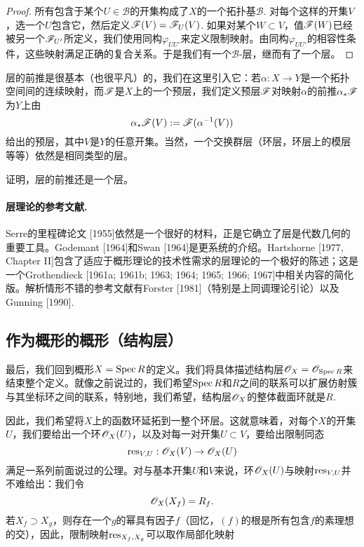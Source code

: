 \begin{proof}
	所有包含于某个$U\in\mathscr{B}$的开集构成了$X$的一个拓扑基$\mathscr{B}$. 对每个这样的开集$V$，选一个$U$包含它，然后定义$\mathscr{F}(V)=\mathscr{F}_U(V)$. 如果对某个$W\subset V$，值$\mathscr{F}(W)$已经被另一个$\mathscr{F}_{U'}$所定义，我们使用同构$\varphi_{UU'}$来定义限制映射。由同构$\varphi_{UU'}$的相容性条件，这些映射满足正确的复合关系。于是我们有一个$\mathscr{B}$\hyp 层，继而有了一个层。
\end{proof}

层的前推是很基本（也很平凡）的，我们在这里引入它：若$\alpha:X\to Y$是一个拓扑空间间的连续映射，而$\mathscr{F}$是$X$上的一个预层，我们定义预层$\mathscr{F}$对映射$\alpha$的前推$\alpha_*\mathscr{F}$为$Y$上由
\[
	\alpha_*\mathscr{F}(V):=\mathscr{F}(\alpha^{-1}(V))
\]
给出的预层，其中$V$是$Y$的任意开集。当然，一个交换群层（环层，环层上的模层等等）依然是相同类型的层。

\begin{exe}
证明，层的前推还是一个层。
\end{exe}

\paragraph*{层理论的参考文献.}\label{ref:1} Serre的里程碑论文 [1955]依然是一个很好的材料，正是它确立了层是代数几何的重要工具。Godemant [1964]和Swan [1964]是更系统的介绍。Hartshorne [1977, Chapter II]包含了适应于概形理论的技术性需求的层理论的一个极好的陈述；这是一个Grothendieck [1961a; 1961b; 1963; 1964; 1965; 1966; 1967]中相关内容的简化版。解析情形不错的参考文献有Forster [1981]（特别是上同调理论引论）以及Gunning [1990].

\subsection{作为概形的概形（结构层）}

最后，我们回到概形$X=\operatorname{Spec} R$的定义。我们将具体描述结构层$\mathscr{O}_X=\mathscr{O}_{\operatorname{Spec} R}$来结束整个定义。就像之前说过的，我们希望$\operatorname{Spec} R$和$R$之间的联系可以扩展仿射簇与其坐标环之间的联系，特别地，我们希望，结构层$\mathscr{O}_X$的整体截面环就是$R$.

因此，我们希望将$X$上的函数环延拓到一整个环层。这就意味着，对每个$X$的开集$U$，我们要给出一个环$\mathscr{O}_X(U)$，以及对每一对开集$U\subset V$，要给出限制同态
\[
	\operatorname{res}_{V,U}:\mathscr{O}_X(V)\to \mathscr{O}_X(U)
\]
满足一系列前面说过的公理。对与基本开集$U$和$V$来说，环$\mathscr{O}_X(U)$与映射$\operatorname{res}_{V,U}$并不难给出：我们令
\[
	\mathscr{O}_X(X_f)=R_f.
\]
若$X_f\supset X_g$，则存在一个$g$的幂具有因子$f$（回忆，$(f)$的根是所有包含$f$的素理想的交），因此，限制映射$\operatorname{res}_{X_f,X_g}$可以取作局部化映射%

